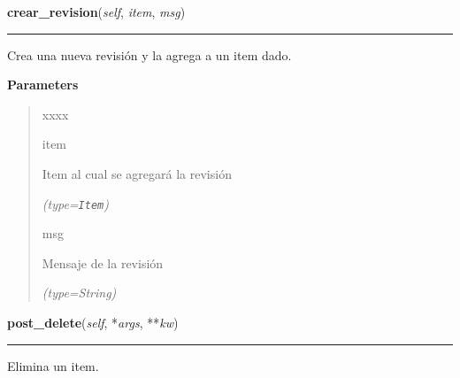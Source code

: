 \hspace{.8\funcindent}\begin{boxedminipage}{\funcwidth}

    \raggedright \textbf{crear\_revision}(\textit{self}, \textit{item}, \textit{msg})

    \vspace{-1.5ex}

    \rule{\textwidth}{0.5\fboxrule}
\setlength{\parskip}{2ex}
    Crea una nueva revisión y la agrega a un item dado.

\setlength{\parskip}{1ex}
      \textbf{Parameters}
      \vspace{-1ex}

      \begin{quote}
        \begin{Ventry}{xxxx}

          \item[item]

          Item al cual se agregará la revisión

            {\it (type=\texttt{Item})}

          \item[msg]

          Mensaje de la revisión

            {\it (type=String)}

        \end{Ventry}

      \end{quote}

    \end{boxedminipage}

    \label{saip:controllers:item_controller:ItemController:post_delete}

    \vspace{0.5ex}

\hspace{.8\funcindent}\begin{boxedminipage}{\funcwidth}

    \raggedright \textbf{post\_delete}(\textit{self}, *\textit{args}, **\textit{kw})

    \vspace{-1.5ex}

    \rule{\textwidth}{0.5\fboxrule}
\setlength{\parskip}{2ex}
    Elimina un item.

\setlength{\parskip}{1ex}
    \end{boxedminipage}

